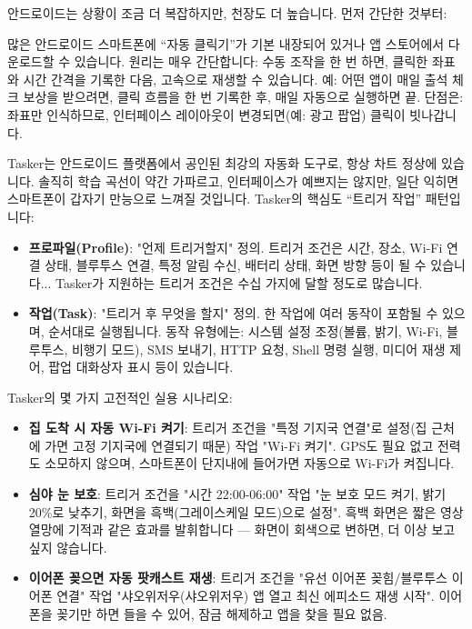 안드로이드는 상황이 조금 더 복잡하지만, 천장도 더 높습니다. 먼저 간단한 것부터:


많은 안드로이드 스마트폰에 “자동 클릭기”가 기본 내장되어 있거나 앱 스토어에서 다운로드할 수 있습니다. 원리는 매우 간단합니다: 수동 조작을 한 번 하면, 클릭한 좌표와 시간 간격을 기록한 다음, 고속으로 재생할 수 있습니다. 예: 어떤 앱이 매일 출석 체크 보상을 받으려면, 클릭 흐름을 한 번 기록한 후, 매일 자동으로 실행하면 끝. 단점은: 좌표만 인식하므로, 인터페이스 레이아웃이 변경되면(예: 광고 팝업) 클릭이 빗나갑니다.


Tasker는 안드로이드 플랫폼에서 공인된 최강의 자동화 도구로, 항상 차트 정상에 있습니다. 솔직히 학습 곡선이 약간 가파르고, 인터페이스가 예쁘지는 않지만, 일단 익히면 스마트폰이 갑자기 만능으로 느껴질 것입니다. Tasker의 핵심도 “트리거 작업” 패턴입니다:

\begin{itemize}
  \item \textbf{프로파일(Profile)}: "언제 트리거할지" 정의. 트리거 조건은 시간, 장소, Wi-Fi 연결 상태, 블루투스 연결, 특정 알림 수신, 배터리 상태, 화면 방향 등이 될 수 있습니다... Tasker가 지원하는 트리거 조건은 수십 가지에 달할 정도로 많습니다.
  \item \textbf{작업(Task)}: "트리거 후 무엇을 할지" 정의. 한 작업에 여러 동작이 포함될 수 있으며, 순서대로 실행됩니다. 동작 유형에는: 시스템 설정 조정(볼륨, 밝기, Wi-Fi, 블루투스, 비행기 모드), SMS 보내기, HTTP 요청, Shell 명령 실행, 미디어 재생 제어, 팝업 대화상자 표시 등이 있습니다.
\end{itemize}

Tasker의 몇 가지 고전적인 실용 시나리오:

\begin{itemize}
  \item \textbf{집 도착 시 자동 Wi-Fi 켜기}: 트리거 조건을 "특정 기지국 연결"로 설정(집 근처에 가면 고정 기지국에 연결되기 때문) 작업 "Wi-Fi 켜기". GPS도 필요 없고 전력도 소모하지 않으며, 스마트폰이 단지내에 들어가면 자동으로 Wi-Fi가 켜집니다.
  \item \textbf{심야 눈 보호}: 트리거 조건을 "시간 22:00-06:00" 작업 "눈 보호 모드 켜기, 밝기 20\%로 낮추기, 화면을 흑백(그레이스케일 모드)으로 설정". 흑백 화면은 짧은 영상 열망에 기적과 같은 효과를 발휘합니다 — 화면이 회색으로 변하면, 더 이상 보고 싶지 않습니다.
  \item \textbf{이어폰 꽂으면 자동 팟캐스트 재생}: 트리거 조건을 "유선 이어폰 꽂힘/블루투스 이어폰 연결" 작업 "샤오위저우(샤오위저우) 앱 열고 최신 에피소드 재생 시작". 이어폰을 꽂기만 하면 들을 수 있어, 잠금 해제하고 앱을 찾을 필요 없음.
\end{itemize}

